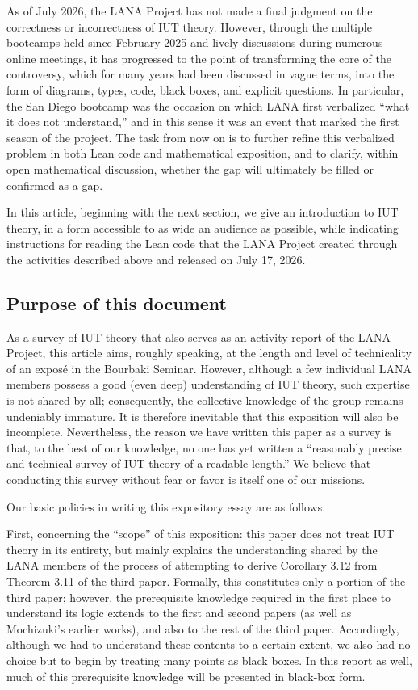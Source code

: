 \documentclass[12pt, reqno, a4paper]{amsart}
\begin{document}
As of July 2026, the LANA Project has not made a final judgment on the correctness or incorrectness of IUT theory. However, through the multiple bootcamps held since February 2025 and lively discussions during numerous online meetings, it has progressed to the point of transforming the core of the controversy, which for many years had been discussed in vague terms, into the form of diagrams, types, code, black boxes, and explicit questions. In particular, the San Diego bootcamp was the occasion on which LANA first verbalized ``what it does not understand,'' and in this sense it was an event that marked the first season of the project. The task from now on is to further refine this verbalized problem in both Lean code and mathematical exposition, and to clarify, within open mathematical discussion, whether the gap will ultimately be filled or confirmed as a gap.

In this article, beginning with the next section, we give an introduction to IUT theory, in a form accessible to as wide an audience as possible, while indicating instructions for reading the Lean code that the LANA Project created through the activities described above and released on July 17, 2026.


\subsection{Purpose of this document}
As a survey of IUT theory that also serves as an activity report of the LANA Project, this article aims, roughly speaking, at the length and level of technicality of an expos\'e in the Bourbaki Seminar. However, although a few individual LANA members possess a good (even deep) understanding of IUT theory, such expertise is not shared by all; consequently, the collective knowledge of the group remains undeniably immature. It is therefore inevitable that this exposition will also be incomplete. Nevertheless, the reason we have written this paper as a survey is that, to the best of our knowledge, no one has yet written a ``reasonably precise and technical survey of IUT theory of a readable length.'' We believe that conducting this survey without fear or favor is itself one of our missions.

Our basic policies in writing this expository essay are as follows.

First, concerning the ``scope'' of this exposition: this paper does not treat IUT theory in its entirety, but mainly explains the understanding shared by the LANA members of the process of attempting to derive Corollary 3.12 from Theorem 3.11 of the third paper. Formally, this constitutes only a portion of the third paper; however, the prerequisite knowledge required in the first place to understand its logic extends to the first and second papers (as well as Mochizuki's earlier works), and also to the rest of the third paper. Accordingly, although we had to understand these contents to a certain extent, we also had no choice but to begin by treating many points as black boxes. In this report as well, much of this prerequisite knowledge will be presented in black-box form.
\end{document}
